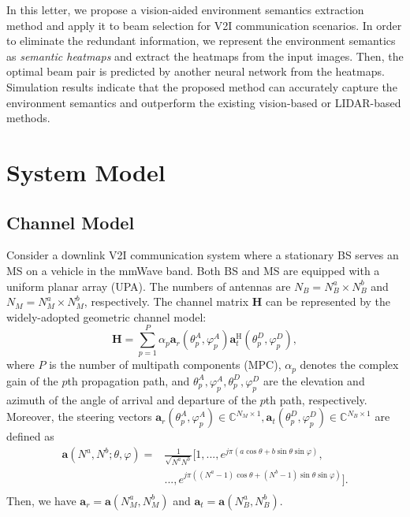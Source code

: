 \documentclass[lettersize,journal]{IEEEtran}
\begin{document}
In this letter, we propose a vision-aided environment semantics extraction method and apply it to beam selection for V2I communication scenarios. 
In order to eliminate the redundant information, we represent the environment semantics as \textit{semantic heatmaps} and extract the heatmaps from the input images.
Then, the optimal beam pair is predicted by another neural network from the heatmaps. 
Simulation results indicate that the proposed method can accurately capture the environment semantics and outperform the existing vision-based or LIDAR-based methods.


\section{System Model}
\subsection{Channel Model}
Consider a downlink V2I communication system where a stationary BS serves an MS on a vehicle in the mmWave band. 
Both BS and MS are equipped with a uniform planar array (UPA). The numbers of antennas are $N_B = N_{B}^a \times N_{B}^b$ and $N_M = N_{M}^a \times N_{M}^b$, respectively. 
The channel matrix $\mathbf{H}$ can be {represented} by the widely-adopted geometric channel model:
\begin{equation}
  \label{channelmatrix}
  \mathbf{H} = \sum_{p=1}^{P} \alpha_p \mathbf{a}_r(\theta_p^{A}, \varphi_p^{A}) \mathbf{a}_t^{\mathrm{H}}(\theta_p^{D}, \varphi_p^{D}),
\end{equation}
where $P$ is the number of multipath components (MPC), $\alpha_p$ denotes the complex gain of the $p$th propagation path, and
$\theta_p^{A}, \varphi_p^{A}, \theta_p^{D}, \varphi_p^{D}$ are the elevation and azimuth of the angle of arrival and departure of the $p$th path, respectively.
Moreover, the steering vectors $\mathbf{a}_r(\theta_p^{A}, \varphi_p^{A}) \in \mathbb{C}^{N_M \times 1}, \mathbf{a}_t(\theta_p^{D}, \varphi_p^{D}) \in \mathbb{C}^{N_B \times 1}$ are defined as
\begin{equation}
  \label{steeringvector}
  \begin{aligned}
  \mathbf{a}(N^a, N^b; \theta, \varphi) =& \frac{1}{\sqrt{N^aN^b}}[1, ..., e^{j\pi(a\cos{\theta} + b\sin{\theta}\sin{\varphi})},\\
   &..., e^{j\pi((N^a - 1)\cos{\theta} + (N^b - 1)\sin{\theta}\sin{\varphi})}].\\
  \end{aligned}
\end{equation}
Then, we have $\mathbf{a}_r = \mathbf{a}(N_M^a, N_M^b)$ and $ \mathbf{a}_t = \mathbf{a}(N_B^a, N_B^b)$.
\end{document}
